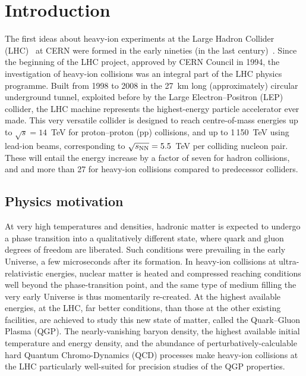 \section{Introduction}
\label{secall:intro}
The first ideas about heavy-ion experiments at the Large Hadron Collider (LHC)~\cite{Evans:2008zzb} at CERN were formed in the early nineties (in the last century)~\cite{Jarlskog:1990dv}. Since the beginning of the LHC project, approved by CERN Council in 1994, the investigation of heavy-ion collisions was an integral part of the LHC physics programme. Built from 1998 to 2008 in the 27~km long (approximately) circular underground tunnel, exploited before by the Large Electron--Positron (LEP) collider, the LHC machine represents the highest-energy particle accelerator ever made. This very versatile collider is designed to reach centre-of-mass energies up to $\sqrt{s} = 14$~TeV for proton--proton (pp) collisions, and up to 1\,150~TeV using lead-ion beams, corresponding to $\sqrt{s_{\rm NN}} = 5.5$~TeV per colliding nucleon pair. These will entail the energy increase by a factor of seven for hadron collisions, and and more than 27 for heavy-ion collisions compared to predecessor colliders.
\subsection{Physics motivation}
\label{subsecall:motivation}
At very high temperatures and densities, hadronic matter is expected to undergo a phase transition into a qualitatively different state, where quark and gluon degrees of freedom are liberated. Such conditions were prevailing in the early Universe, a few microseconds after its formation. In heavy-ion collisions at ultra-relativistic energies, nuclear matter is heated and compressed reaching conditions well beyond the phase-transition point, and the same type of medium filling the very early Universe is thus momentarily re-created. At the highest available energies, at the LHC, far better conditions, than those at the other existing facilities, are achieved to study this new state of matter, called the Quark--Gluon Plasma (QGP). The nearly-vanishing baryon density, the highest available initial temperature and energy density, and the abundance of perturbatively-calculable hard Quantum Chromo-Dynamics (QCD) processes make heavy-ion collisions at the LHC particularly well-suited for precision studies of the QGP properties.

